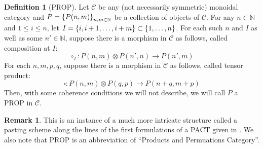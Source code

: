 \documentclass{amsart}
\newcommand{\N}{\mathbb{N}}
\newcommand{\s}{\mathscr}
\newcommand{\tensor}{\otimes}
\renewcommand{\to}[1][]{\stackrel{#1}{\longrightarrow}}
\newcommand{\curly}[1]{\left\{ #1 \right\}}
\newcommand{\set}[2][]{\ifthenelse{\equal{#1}{}}
                                  {\curly{#2}}
                                  {\curly{#1\ \textbf{:}\ #2}}}
\numberwithin{thm}{section}
\theoremstyle{definition}
\newtheorem{defn}[thm]{Definition}
\newtheorem{rmk}[thm]{Remark}
\begin{document}
\begin{defn}[PROP]
Let $\s{C}$ be any (not necessarily symmetric) monoidal category and
$P = \set{P(n, m)}_{n, m \in \N}$ be a
collection of objects of $\s{C}$. For any $n \in \N$ and $1 \leq i \leq n$,
let $I = \set{i, i + 1, \dots, i + m} \subset \set{1, \dots, n}$. For each
such $n$ and $I$ as well as some $n' \in \N$, suppose there is a morphism in
$\s{C}$ as follows, called composition at $I$:
\[
  \circ_I : P(n, m) \tensor P(n', n) \to P(n', m)
\]
For each $n, m, p, q$, suppose there is a morphism in $\s{C}$ as follows,
called tensor product:
\[
  \square : P(n, m) \otimes P(q, p) \to P(n + q, m + p)
\]
Then, with some coherence conditions we will not describe, we will call
$P$ a PROP in $\s{C}$.
\end{defn}

\begin{rmk}
This is an instance of a much more intricate structure called a pasting scheme
\cite{JY15} along the lines of the first formulations of a PACT given in
\cite{MacLane65}. We also note that PROP is an abbreviation of ``Products and
Permuations Category''.
\end{rmk}
\end{document}
